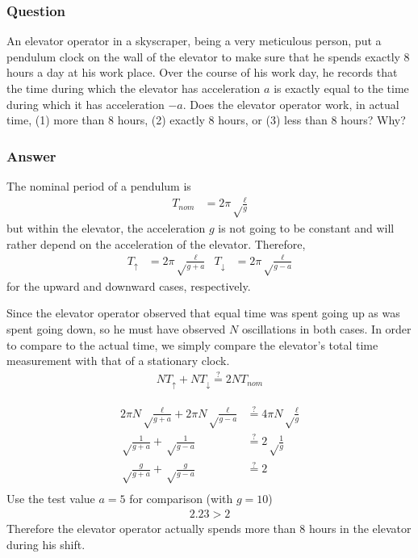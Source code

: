 \subsubsection{Question}

An elevator operator in a skyscraper, being a very meticulous person, put a
pendulum clock on the wall of the elevator to make sure that he spends exactly 8
hours a day at his work place. Over the course of his work day, he records that
the time during which the elevator has acceleration $a$ is exactly equal to the
time during which it has acceleration $-a$. Does the elevator operator work, in
actual time, (1) more than 8 hours, (2) exactly 8 hours, or (3) less than 8
hours? Why?

\subsubsection{Answer}
The nominal period of a pendulum is
\begin{align*}
	T_{nom} &= 2π \sqrt\frac{ℓ}{g}
\end{align*}
but within the elevator, the acceleration $g$ is not going to be constant and
will rather depend on the acceleration of the elevator. Therefore,
\begin{align*}
	T_↑ &= 2π\sqrt\frac{ℓ}{g+a} & T_↓ &= 2π\sqrt\frac{ℓ}{g-a}
\end{align*}
for the upward and downward cases, respectively.

Since the elevator operator observed that equal time was spent going up as was
spent going down, so he must have observed $N$ oscillations in both cases. In
order to compare to the actual time, we simply compare the elevator's total time
measurement with that of a stationary clock.
\begin{align*}
	NT_↑ + NT_↓ \stackrel{?}{=} 2NT_{nom}
\end{align*}

\begin{align*}
	2πN\sqrt\frac{ℓ}{g+a} + 2πN\sqrt\frac{ℓ}{g-a}
		&\stackrel{?}{=} 4πN\sqrt\frac{ℓ}{g}
		\\
	\sqrt\frac{1}{g+a} + \sqrt\frac{1}{g-a} &\stackrel{?}{=} 2\sqrt\frac{1}{g}\\
	\sqrt\frac{g}{g+a} + \sqrt\frac{g}{g-a} &\stackrel{?}{=} 2 \\
\end{align*}
Use the test value $a=5$ for comparison (with $g = 10$)
\begin{align}
	\boxed{
	2.23 > 2
	}
\end{align}
Therefore the elevator operator actually spends more than 8 hours in the
elevator during his shift.

